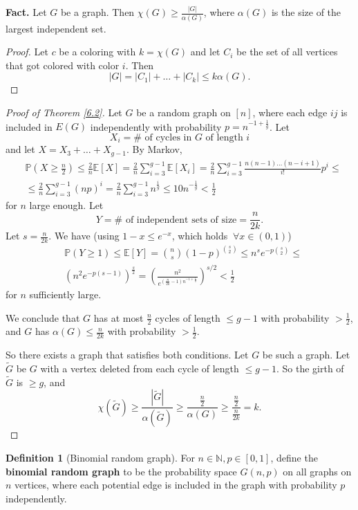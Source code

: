 \documentclass{article}
\theoremstyle{definition}
\newtheorem{defn}{Definition}[section]
\begin{document}
\textbf{Fact.} Let $G$ be a graph. Then $\chi(G)\ge \frac{|G|}{\alpha(G)}$, where $\alpha(G)$ is the size of the largest independent set.
\begin{proof}
    Let $c$ be a coloring with $k=\chi(G)$ and let $C_i$ be the set of all vertices that got colored with color $i$. Then \[
    |G|=|C_1|+\ldots+|C_k| \le k \alpha(G).
    \]
\end{proof} 
\begin{proof}[Proof of Theorem \ref{6.2}]
    Let $G$ be a random graph on $[n]$, where each edge $ij$ is included in $E(G)$ independently with probability $p=n^{-1+\frac{1}{g}}$. Let \[
    X_i = \# \text{ of cycles in }G \text{ of length }i
    \]
    and let $X=X_3+\ldots+X_{g-1}$. By Markov, 
    \begin{align*}
        &\mathbb{P}(X \ge \frac{n}{2}) \le \frac{2}{n} \mathbb{E}[X] = \frac{2}{n} \sum_{i=3}^{g-1} \mathbb{E}[X_i] =\frac{2}{n} \sum_{i=3}^{g-1} \frac{n(n-1)\ldots(n-i+1)}{i!}p^{i} \le \\
        &\le \frac{2}{n}\sum_{i=3}^{g-1} (np)^i = \frac{2}{n} \sum_{i=3}^{g-1} n^{\frac{i}{g}} \le 10 n^{-\frac{1}{g}} < \frac{1}{2} 
    \end{align*}
    for $n$ large enough.  Let \[
    Y = \# \text{ of independent sets of size}=\frac{n}{2k}.
    \]
    Let $s=\frac{n}{2k}$. We have (using $1-x \le e^{-x}$, which holds $~\forall x \in (0,1)$)
    \begin{align*}
        &\mathbb{P}(Y\ge 1) \le \mathbb{E}[Y] = {{n}\choose{s}}(1-p)^{{s\choose{2}}}\le n^s e^{-p {{s}\choose{2}}} \le \\
        & (n^2 e^{-p(s-1)})^{\frac{s}{2}} = \left(\frac{n^2}{e^{(\frac{n}{2k}-1)n^{-1+\frac{1}{g}}}}\right)^{s/2} < \frac{1}{2}
    \end{align*}
    for $n$ sufficiently large.
    \vspace{1mm}
    
    We conclude that $G$ has at most $\frac{n}{2}$ cycles of length $\le g-1$ with probability $>\frac{1}{2}$, and $G$ has $\alpha(G)\le \frac{n}{2k}$ with probability $>\frac{1}{2}$. 
    \vspace{1mm}
    
    So there exists a graph that satisfies both conditions. Let $G$ be such a graph. Let $\tilde{G}$ be $G$ with a vertex deleted from each cycle of length $\le g-1$. So the girth of $\tilde{G}$ is $\ge g$, and \[
    \chi(\tilde{G}) \ge \frac{|\tilde{G}|}{\alpha(\tilde{G})} \ge \frac{\frac{n}{2}}{\alpha(G)} \ge \frac{\frac{n}{2}}{\frac{n}{2k}} = k.
    \]
\end{proof}
\begin{defn}[Binomial random graph]
    For $n \in \mathbb{N}, p \in [0,1]$, define the \textbf{binomial random graph} to be the probability space $G(n,p)$ on all graphs on $n$ vertices, where each potential edge is included in the graph with probability $p$ independently.
\end{defn}
\end{document}
